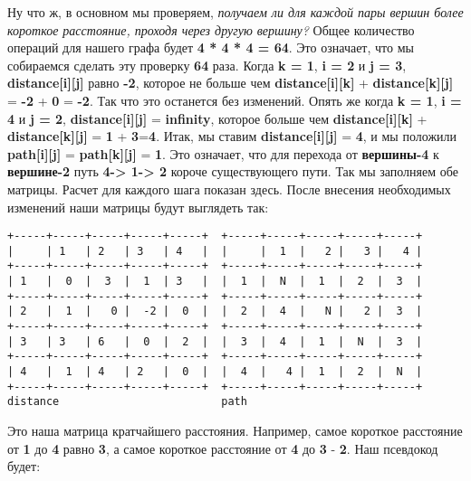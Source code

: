 \vspace{\baselineskip}
Ну что ж, в основном мы проверяем, \textit{получаем ли для каждой пары вершин более короткое расстояние, проходя через другую вершину?} Общее количество операций для нашего графа будет \textbf{4 * 4 * 4 = 64}. Это означает, что мы собираемся сделать эту проверку \textbf{64} раза. Когда \textbf{k = 1}, \textbf{i = 2} и \textbf{j = 3}, \textbf{distance[i][j]} равно \textbf{-2}, которое не больше чем \textbf{distance[i][k]} + \textbf{distance[k][j]} = \textbf{-2} + \textbf{0} = \textbf{-2}. Так что это останется без изменений.  Опять же когда \textbf{k = 1}, \textbf{i = 4} и \textbf{j = 2}, \textbf{distance[i][j]} = \textbf{infinity}, которое больше чем \textbf{distance[i][k]} + \textbf{distance[k][j]} = \textbf{1} + \textbf{3}=\textbf{4}. Итак, мы ставим \textbf{distance[i][j]} = \textbf{4}, и мы положили \textbf{path[i][j]} = \textbf{path[k][j]} = \textbf{1}. Это означает, что для перехода от \textbf{вершины-4} к \textbf{вершине-2} путь \textbf{4-> 1-> 2} короче существующего пути. Так мы заполняем обе матрицы. Расчет для каждого шага показан здесь. После внесения необходимых изменений наши матрицы будут выглядеть так:

\vspace{\baselineskip}
\begin{tcolorbox}
\begin{verbatim}
+-----+-----+-----+-----+-----+  +-----+-----+-----+-----+-----+
|     | 1   | 2   | 3   | 4   |  |     |  1  |   2 |   3 |   4 |
+-----+-----+-----+-----+-----+  +-----+-----+-----+-----+-----+
| 1   |  0  |  3  |  1  | 3   |  |  1  |  N  |  1  |  2  |  3  |
+-----+-----+-----+-----+-----+  +-----+-----+-----+-----+-----+
| 2   |  1  |   0 |  -2 |  0  |  |  2  |  4  |   N |   2 |  3  |
+-----+-----+-----+-----+-----+  +-----+-----+-----+-----+-----+
| 3   | 3   | 6   |  0  |  2  |  |  3  |  4  |  1  |  N  |  3  |
+-----+-----+-----+-----+-----+  +-----+-----+-----+-----+-----+
| 4   |  1  | 4   | 2   |  0  |  |  4  |   4 |  1  |  2  |  N  |
+-----+-----+-----+-----+-----+  +-----+-----+-----+-----+-----+
distance                         path
\end{verbatim}
\end{tcolorbox}

\vspace{\baselineskip}
Это наша матрица кратчайшего расстояния. Например, самое короткое расстояние от \textbf{1} до \textbf{4} равно \textbf{3}, а самое короткое расстояние от \textbf{4} до \textbf{3} - \textbf{2}. Наш псевдокод будет:

